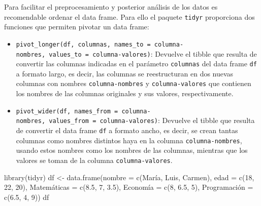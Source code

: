 \documentclass[
  a4paper,
]{scrreport}
\newenvironment{Shaded}{\begin{snugshade}}{\end{snugshade}}
\newcommand{\AttributeTok}[1]{\textcolor[rgb]{0.40,0.45,0.13}{#1}}
\newcommand{\DecValTok}[1]{\textcolor[rgb]{0.68,0.00,0.00}{#1}}
\newcommand{\FloatTok}[1]{\textcolor[rgb]{0.68,0.00,0.00}{#1}}
\newcommand{\FunctionTok}[1]{\textcolor[rgb]{0.28,0.35,0.67}{#1}}
\newcommand{\NormalTok}[1]{\textcolor[rgb]{0.00,0.23,0.31}{#1}}
\newcommand{\OtherTok}[1]{\textcolor[rgb]{0.00,0.23,0.31}{#1}}
\newcommand{\StringTok}[1]{\textcolor[rgb]{0.13,0.47,0.30}{#1}}
\theoremstyle{definition}
\theoremstyle{definition}
\theoremstyle{remark}
\begin{document}
Para facilitar el preprocesamiento y posterior análisis de los datos es
recomendable ordenar el data frame. Para ello el paquete \texttt{tidyr}
proporciona dos funciones que permiten pivotar un data frame:

\begin{itemize}
\item
  \texttt{pivot\_longer(df,\ columnas,\ names\_to\ =\ columna-nombres,\ values\_to\ =\ columna-valores)}:
  Devuelve el tibble que resulta de convertir las columnas indicadas en
  el parámetro \texttt{columnas} del data frame \texttt{df} a formato
  largo, es decir, las columnas se reestructuran en dos nuevas columnas
  con nombres \texttt{columna-nombres} y \texttt{columna-valores} que
  contienen los nombres de las columnas originales y sus valores,
  respectivamente.
\item
  \texttt{pivot\_wider(df,\ names\_from\ =\ columna-nombres,\ values\_from\ =\ columna-valores)}:
  Devuelve el tibble que resulta de convertir el data frame \texttt{df}
  a formato ancho, es decir, se crean tantas columnas como nombres
  distintos haya en la columna \texttt{columna-nombres}, usando estos
  nombres como los nombres de las columnas, mientras que los valores se
  toman de la columna \texttt{columna-valores}.
\end{itemize}

\begin{Shaded}
\begin{Highlighting}[]
\FunctionTok{library}\NormalTok{(tidyr)}
\NormalTok{df }\OtherTok{\textless{}{-}} \FunctionTok{data.frame}\NormalTok{(}\AttributeTok{nombre =} \FunctionTok{c}\NormalTok{(}\StringTok{\textquotesingle{}María\textquotesingle{}}\NormalTok{, }\StringTok{\textquotesingle{}Luis\textquotesingle{}}\NormalTok{, }\StringTok{\textquotesingle{}Carmen\textquotesingle{}}\NormalTok{), }
\AttributeTok{edad =} \FunctionTok{c}\NormalTok{(}\DecValTok{18}\NormalTok{, }\DecValTok{22}\NormalTok{, }\DecValTok{20}\NormalTok{), }
\NormalTok{Matemáticas }\OtherTok{=} \FunctionTok{c}\NormalTok{(}\FloatTok{8.5}\NormalTok{, }\DecValTok{7}\NormalTok{, }\FloatTok{3.5}\NormalTok{),}
\NormalTok{Economía }\OtherTok{=} \FunctionTok{c}\NormalTok{(}\DecValTok{8}\NormalTok{, }\FloatTok{6.5}\NormalTok{, }\DecValTok{5}\NormalTok{),}
\NormalTok{Programación }\OtherTok{=} \FunctionTok{c}\NormalTok{(}\FloatTok{6.5}\NormalTok{, }\DecValTok{4}\NormalTok{, }\DecValTok{9}\NormalTok{))}
\NormalTok{df}
\end{Highlighting}
\end{Shaded}
\end{document}

